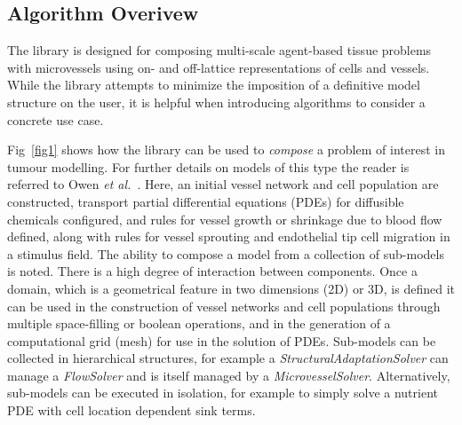 \documentclass[10pt,letterpaper]{article}
\begin{document}
\subsection*{Algorithm Overivew}

The library is designed for composing multi-scale agent-based tissue problems with microvessels using on- and off-lattice representations of cells and vessels. While the library attempts to minimize the imposition of a definitive model structure on the user, it is helpful when introducing algorithms to consider a concrete use case. 

Fig~\ref{fig1} shows how the library can be used to \emph{compose} a problem of interest in tumour modelling. For further details on models of this type the reader is referred to Owen \emph{et al.}~\cite{Owen2011}. Here, an initial vessel network and cell population are constructed, transport partial differential equations (PDEs) for diffusible chemicals configured, and rules for vessel growth or shrinkage due to blood flow defined, along with rules for vessel sprouting and endothelial tip cell migration in a stimulus field. The ability to compose a model from a collection of sub-models is noted. There is a high degree of interaction between components. Once a domain, which is a geometrical feature in two dimensions (2D) or 3D, is defined it can be used in the construction of vessel networks and cell populations through multiple space-filling or boolean operations, and in the generation of a computational grid (mesh) for use in the solution of PDEs. Sub-models can be collected in hierarchical structures, for example a \textit{StructuralAdaptationSolver} can manage a \textit{FlowSolver} and is itself managed by a \textit{MicrovesselSolver}. Alternatively, sub-models can be executed in isolation, for example to simply solve a nutrient PDE with cell location dependent sink terms.
\end{document}
